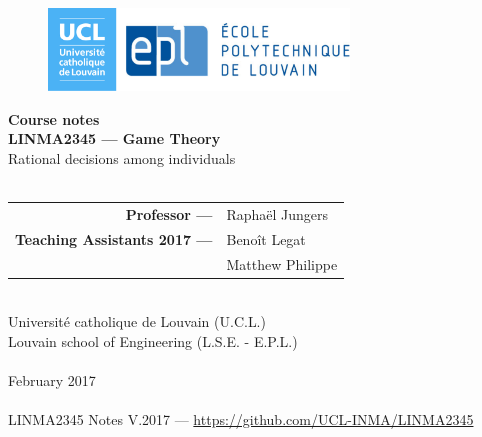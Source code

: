 \ifx \globalmark \undefined %

\else 	
\fi



\begin{titlepage}
\begin{center}



\vfill

\begin{figure}[!ht]
\centering
\includegraphics[width = 8cm]{Logo_UCL-EPL.eps}
\end{figure}







{ \bfseries Course notes }
\hrulefill\\[0.5cm]
\large{\textbf{LINMA2345 --- Game Theory}\\
Rational decisions among individuals} \\
\hrulefill\\[0.5cm]


\vfill
\vfill
\parbox[H][][c]{\textwidth}
	{
	\begin{tabular}{rl}
	\textbf{Professor ---} &  Rapha\"el Jungers \\	 		
	\textbf{Teaching Assistants 2017 ---} 	 &	Beno\^it Legat \\	
		     &	Matthew Philippe 	
	\end{tabular}
	}\par
	



%
$\,$\\[1cm]


Universit\'e catholique de Louvain (U.C.L.)\\
Louvain school of Engineering (L.S.E. - E.P.L.)\\
$\,$\\
February 2017\\
$\,$\\
\tiny{LINMA2345 Notes V.2017 --- \url{https://github.com/UCL-INMA/LINMA2345}}
\end{center}

\end{titlepage}







